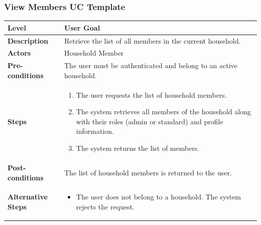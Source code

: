 \subsubsection{View Members UC Template}
\begin{longtable}{|p{3.5cm}|p{10.3cm}|}
\hline
\rowcolor{UCRow} \textbf{Level} & User Goal \\ \hline
\textbf{Description} & Retrieve the list of all members in the current household. \\ \hline
\rowcolor{UCRow} \textbf{Actors} & Household Member \\ \hline
\textbf{Pre-conditions} & The user must be authenticated and belong to an active household. \\ \hline
\rowcolor{UCRow} \textbf{Steps} &
\begin{enumerate}[nosep, leftmargin=*]
    \item The user requests the list of household members.
    \item The system retrieves all members of the household along with their roles (admin or standard) and profile information.
    \item The system returns the list of members.
\end{enumerate} \\ \hline
\textbf{Post-conditions} & The list of household members is returned to the user. \\ \hline
\rowcolor{UCRow} \textbf{Alternative Steps} &
\begin{itemize}[nosep, leftmargin=2.5em]
    \item[\textbf{A1.}] The user does not belong to a household. The system rejects the request.
\end{itemize} \\ \hline
\end{longtable}


